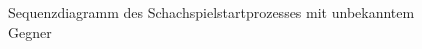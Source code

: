 \begin{figure}
\begin{adjustbox}{width=\textwidth}
\begin{sequencediagram}[scale=0.2]
    
    
  \end{sequencediagram}
  \end{adjustbox}
  
  \caption{Sequenzdiagramm des Schachspielstartprozesses mit unbekanntem Gegner}
  \label{fig:sequence_chess_start}
\end{figure}




